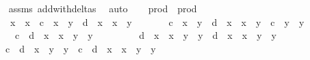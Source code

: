 \begin{isabellebody}
\ \ \ \ \isamarkupfalse%
\ assms\ add{\isacharunderscore}with{\isacharunderscore}deltas\ \isamarkupfalse%
\ auto\isanewline
\ \ \isamarkupfalse%
\ prod\ \ {\isachardoublequoteopen}prod\ {\isacharequal}\ \isanewline
\ \ \ \ {\isacharminus}{}\ {\isacharplus}\ x{}{\isacharcircum}{}\ {\isacharasterisk}\ x{}{\isacharcircum}{}\ {\isacharplus}\ c\ {\isacharasterisk}\ x{}{\isacharcircum}{}\ {\isacharasterisk}\ y{}{\isacharcircum}{}\ {\isacharminus}\ d\ {\isacharasterisk}\ x{}{\isacharcircum}{}\ {\isacharasterisk}\ x{}{\isacharcircum}{}\ {\isacharasterisk}\ y{}{\isacharcircum}{}\ {\isacharplus}\ \isanewline
\ \ \ \ \ c\ {\isacharasterisk}\ x{}{\isacharcircum}{}\ {\isacharasterisk}\ y{}{\isacharcircum}{}\ {\isacharminus}\ d\ {\isacharasterisk}\ x{}{\isacharcircum}{}\ {\isacharasterisk}\ x{}{\isacharcircum}{}\ {\isacharasterisk}\ y{}{\isacharcircum}{}\ {\isacharplus}\ c{\isacharcircum}{}\ {\isacharasterisk}\ y{}{\isacharcircum}{}\ {\isacharasterisk}\ y{}{\isacharcircum}{}\ {\isacharminus}\ \isanewline
\ \ \ \ \ {}\ {\isacharasterisk}\ c\ {\isacharasterisk}\ d\ {\isacharasterisk}\ x{}{\isacharcircum}{}\ {\isacharasterisk}\ x{}{\isacharcircum}{}\ {\isacharasterisk}\ y{}{\isacharcircum}{}\ {\isacharasterisk}\ y{}{\isacharcircum}{}\ {\isacharplus}\ \isanewline
\ \ \ \ \ {}\ {\isacharasterisk}\ d{\isacharcircum}{}\ {\isacharasterisk}\ x{}{\isacharcircum}{}\ {\isacharasterisk}\ x{}{\isacharcircum}{}\ {\isacharasterisk}\ y{}{\isacharcircum}{}\ {\isacharasterisk}\ y{}{\isacharcircum}{}\ {\isacharplus}\ d{\isacharcircum}{}\ {\isacharasterisk}\ x{}{\isacharcircum}{}\ {\isacharasterisk}\ x{}{\isacharcircum}{}\ {\isacharasterisk}\ y{}{\isacharcircum}{}\ {\isacharasterisk}\ y{}{\isacharcircum}{}\ {\isacharminus}\ \isanewline
\ \ \ \ \ c{\isacharcircum}{}\ {\isacharasterisk}\ d\ {\isacharasterisk}\ x{}{\isacharcircum}{}\ {\isacharasterisk}\ y{}{\isacharcircum}{}\ {\isacharasterisk}\ y{}{\isacharcircum}{}\ {\isacharplus}\ c\ {\isacharasterisk}\ d{\isacharcircum}{}\ {\isacharasterisk}\ x{}{\isacharcircum}{}\ {\isacharasterisk}\ x{}{\isacharcircum}{}\ {\isacharasterisk}\ y{}{\isacharcircum}{}\ {\isacharasterisk}\ y{}{\isacharcircum}{}\ {\isacharminus}\ \isanewline

\end{isabellebody}
